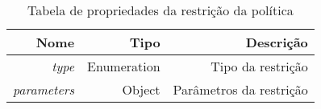 \begin{table}[!htb]
    \centering
    \caption[Representação de uma restrição]{Tabela de propriedades da restrição da política
    \label{tab:constraint-shape}}
    \begin{tabular}{rrr}
        \toprule
            Nome & Tipo & Descrição \\ 
        \midrule
            \textit{type} & Enumeration & Tipo da restrição \\
            \textit{parameters} & Object &  Parâmetros da restrição \\
        \bottomrule
    \end{tabular}
\end{table}
